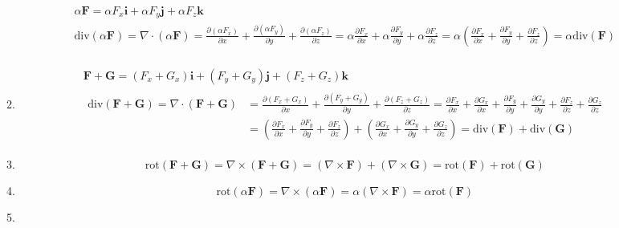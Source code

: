 \begin{enumerate}[label=\color{red}\textbf{\arabic*)}]
\begin{enumerate}[label=\color{red}\textbf{\alph*)}]
      \[
      \begin{array}{l}
        \alpha \mathbf{F} =\alpha F_x\mathbf{i} +\alpha F_y\mathbf{j} +\alpha F_z\mathbf{k}\\ 
        \mathrm{div} (\alpha \mathbf{F} )=\nabla \cdot (\alpha \mathbf{F} )=\frac{\partial (\alpha F_x)}{\partial x} +\frac{\partial (\alpha F_y)}{\partial y} +\frac{\partial (\alpha F_z)}{\partial z}=\alpha \frac{\partial F_x}{\partial x} + \alpha \frac{\partial F_y}{\partial y} +\alpha \frac{\partial F_z}{\partial z}=\alpha\left( \frac{\partial F_x}{\partial x} +\frac{\partial F_y}{\partial y} +\frac{\partial F_z}{\partial z}  \right) =\alpha \mathrm{div} (\mathbf{F} ) \\
      \end{array}
      \] 
    \item {} 
      \[
      \begin{array}{l}
        \mathbf{F} +\mathbf{G} =(F_x+G_x)\mathbf{i} +(F_y+G_y)\mathbf{j} +(F_z+G_z)\mathbf{k} \\
        \begin{aligned}
        \mathrm{div} (\mathbf{F} +\mathbf{G} )=\nabla \cdot (\mathbf{F} +\mathbf{G} )&=\frac{\partial (F_x+G_x)}{\partial x} +\frac{\partial (F_y+G_y)}{\partial y} +\frac{\partial (F_z+G_z)}{\partial z} =\frac{\partial F_x}{\partial x}+\frac{\partial G_x}{\partial x} +\frac{\partial F_y}{\partial y} +\frac{\partial G_y}{\partial y} +\frac{\partial F_z}{\partial z} +\frac{\partial G_z}{\partial z}   \\
        &=\left(\frac{\partial F_x}{\partial x}+\frac{\partial F_y}{\partial y}+\frac{\partial F_z}{\partial z} \right)+\left( \frac{\partial G_x}{\partial x}+\frac{\partial G_y}{\partial y} +\frac{\partial G_z}{\partial z}   \right) =\mathrm{div} (\mathbf{F} )+\mathrm{div} (\mathbf{G} )
        \end{aligned}
      \end{array}
      \] 
    \item {} 

      \[
      \mathrm{rot} (\mathbf{F} +\mathbf{G} )=\nabla \times (\mathbf{F} +\mathbf{G} )=(\nabla\times  \mathbf{F} )+(\nabla \times \mathbf{G} )=\mathrm{rot} (\mathbf{F} )+\mathrm{rot} (\mathbf{G} )
      \] 
    \item {} 
      \[
      \mathrm{rot} (\alpha \mathbf{F} )=\nabla \times (\alpha\mathbf{F} )=\alpha(\nabla \times \mathbf{F} )=\alpha\mathrm{rot} (\mathbf{F} )
      \] 
    \item {} 


\end{enumerate}
\end{enumerate}

